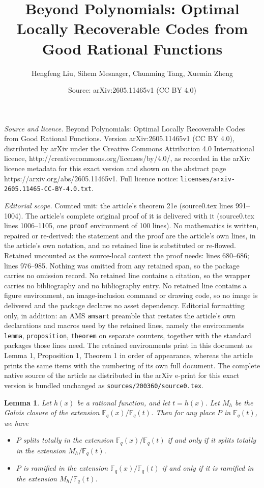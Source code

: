 \documentclass[10pt,a4paper]{amsart}
\title{Beyond Polynomials: Optimal Locally Recoverable Codes from Good Rational Functions}
\author{Hengfeng Liu, Sihem Mesnager, Chunming Tang, Xuemin Zheng}
\date{Source: arXiv:2605.11465v1 (CC BY 4.0)}
\newtheorem{lemma}{Lemma}
\begin{document}
\maketitle

\noindent\emph{Source and licence.} Beyond Polynomials: Optimal Locally Recoverable Codes from Good Rational Functions. Version arXiv:2605.11465v1 (CC BY 4.0), distributed by arXiv under the Creative Commons Attribution 4.0 International licence, http://creativecommons.org/licenses/by/4.0/, as recorded in the arXiv licence metadata for this exact version and shown on the abstract page https://arxiv.org/abs/2605.11465v1. Full licence notice: \texttt{licenses/arxiv-2605.11465-CC-BY-4.0.txt}.\par\smallskip

\noindent\textit{Editorial scope.} Counted unit: the article's theorem 21e (source0.tex lines 991--1004). The article's complete original proof of it is delivered with it (source0.tex lines 1006--1105, one \texttt{proof} environment of 100 lines). No mathematics is written, repaired or re-derived: the statement and the proof are the article's own lines, in the article's own notation, and no retained line is substituted or re-flowed.  Retained uncounted as the source-local context the proof needs: lines 680--686; lines 976--985.  Nothing was omitted from any retained span, so the package carries no omission record.  No retained line contains a citation, so the wrapper carries no bibliography and no bibliography entry.  No retained line contains a figure environment, an image-inclusion command or drawing code, so no image is delivered and the package declares no asset dependency.  Editorial formatting only, in addition: an AMS \texttt{amsart} preamble that restates the article's own declarations and macros used by the retained lines, namely the environments \texttt{lemma}, \texttt{proposition}, \texttt{theorem} on separate counters, together with the standard packages those lines need.  The retained environments print in this document as Lemma 1, Proposition 1, Theorem 1 in order of appearance, whereas the article prints the same items with the numbering of its own full document.  The complete native source of the article as distributed in the arXiv e-print for this exact version is bundled unchanged as \texttt{sources/200360/source0.tex}.
\begin{lemma}\label{M}
Let $h(x)$ be a rational function, and let $t=h(x)$. Let $M_{h}$ be the Galois closure of the extension $\mathbb{F}_q(x)/\mathbb{F}_q(t)$. Then for any place $P$ in $\mathbb{F}_{q}(t)$, we have
\begin{itemize}
\item[(i)] $P$ splits totally in the extension $\mathbb{F}_q(x)/\mathbb{F}_q(t)$ if and only if it splits totally in the extension $M_{h}/\mathbb{F}_q(t)$. 
\item[(ii)] $P$ is ramified in the extension $\mathbb{F}_q(x)/\mathbb{F}_q(t)$ if and only if it is ramified in the extension $M_{h}/\mathbb{F}_q(t)$. 
\end{itemize}
\end{lemma}
\end{document}
